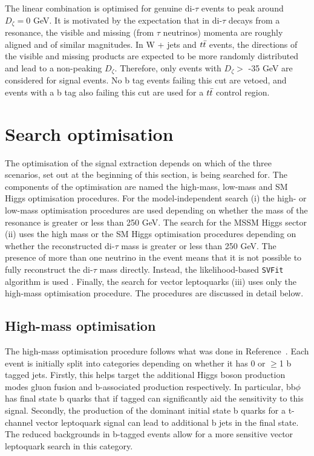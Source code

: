 The linear combination is optimised for genuine di-$\tau$ events to peak around $D_{\zeta} = 0$ GeV. 
It is motivated by the expectation that in di-$\tau$ decays from a resonance, the visible and missing (from $\tau$ neutrinos) momenta are roughly aligned and of similar magnitudes.
In W + jets and $t\bar{t}$ events, the directions of the visible and missing products are expected to be more randomly distributed and lead to a non-peaking $D_{\zeta}$.
Therefore, only events with $D_\zeta >$ -35 GeV are considered for signal events.
No b tag events failing this cut are vetoed, and events with a b tag also failing this cut are used for a $t\bar{t}$ control region.

\section{Search optimisation}
\label{sec:search_optimisation}

The optimisation of the signal extraction depends on which of the three scenarios, set out at the beginning of this section, is being searched for.
The components of the optimisation are named the high-mass, low-mass and \ac{SM} Higgs optimisation procedures.
For the model-independent search (i) the high- or low-mass optimisation procedures are used depending on whether the mass of the resonance is greater or less than 250 GeV.
The search for the \ac{MSSM} Higgs sector (ii) uses the high mass or the \ac{SM} Higgs optimisation procedures depending on whether the reconstructed di-$\tau$ mass is greater or less than 250 GeV.
The presence of more than one neutrino in the event means that it is not possible to fully reconstruct the di-$\tau$ mass directly.
Instead, the likelihood-based \texttt{SVFit} algorithm is used \cite{Bianchini:2014vza}.
Finally, the search for vector leptoquarks (iii) uses only the high-mass optimisation procedure.
The procedures are discussed in detail below. \\

\subsection{High-mass optimisation}
\label{sec:high_mass_optimisation}

The high-mass optimisation procedure follows what was done in Reference~\cite{CMS_MSSM_Tau_2018}.
Each event is initially split into categories depending on whether it has 0 or $\geq$1 b tagged jets.
Firstly, this helps target the additional Higgs boson production modes gluon fusion and b-associated production respectively.
In particular, bb$\phi$ has final state b quarks that if tagged can significantly aid the sensitivity to this signal.
Secondly, the production of the dominant initial state b quarks for a t-channel vector leptoquark signal can lead to additional b jets in the final state.
The reduced backgrounds in b-tagged events allow for a more sensitive vector leptoquark search in this category. \\

